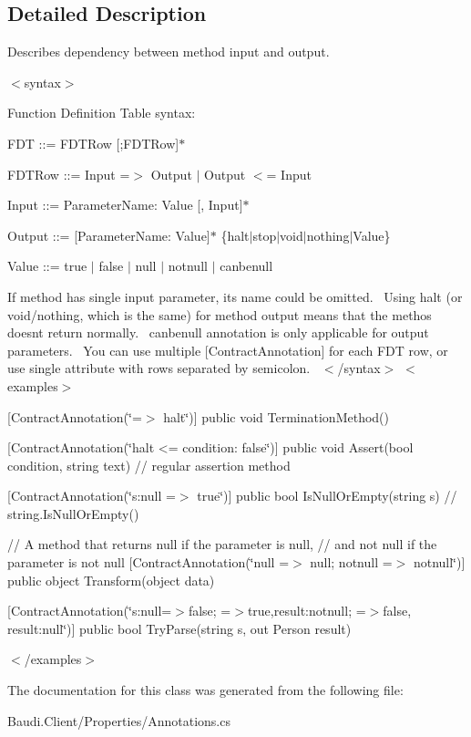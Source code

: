\subsection{Detailed Description}
Describes dependency between method input and output. 

$<$syntax$>$ 

Function Definition Table syntax\+:


\begin{DoxyItemize}
\item F\+D\+T \+:\+:= F\+D\+T\+Row \mbox{[};F\+D\+T\+Row\mbox{]}$\ast$ 
\item F\+D\+T\+Row \+:\+:= Input =$>$ Output $\vert$ Output $<$= Input 
\item Input \+:\+:= Parameter\+Name\+: Value \mbox{[}, Input\mbox{]}$\ast$ 
\item Output \+:\+:= \mbox{[}Parameter\+Name\+: Value\mbox{]}$\ast$ \{halt$\vert$stop$\vert$void$\vert$nothing$\vert$\+Value\} 
\item Value \+:\+:= true $\vert$ false $\vert$ null $\vert$ notnull $\vert$ canbenull 
\end{DoxyItemize}If method has single input parameter, it\textquotesingle{}s name could be omitted.~\newline
 Using {\ttfamily halt} (or {\ttfamily void}/{\ttfamily nothing}, which is the same) for method output means that the methos doesn\textquotesingle{}t return normally.~\newline
 {\ttfamily canbenull} annotation is only applicable for output parameters.~\newline
 You can use multiple {\ttfamily \mbox{[}Contract\+Annotation\mbox{]}} for each F\+D\+T row, or use single attribute with rows separated by semicolon.~\newline
 $<$/syntax$>$ $<$examples$>$
\begin{DoxyItemize}
\item {\ttfamily  \mbox{[}Contract\+Annotation(\char`\"{}=$>$ halt\char`\"{})\mbox{]} public void Termination\+Method() } 
\item {\ttfamily  \mbox{[}Contract\+Annotation(\char`\"{}halt <= condition\+: false\char`\"{})\mbox{]} public void Assert(bool condition, string text) // regular assertion method } 
\item {\ttfamily  \mbox{[}Contract\+Annotation(\char`\"{}s\+:null =$>$ true\char`\"{})\mbox{]} public bool Is\+Null\+Or\+Empty(string s) // string.\+Is\+Null\+Or\+Empty() } 
\item {\ttfamily  // A method that returns null if the parameter is null, // and not null if the parameter is not null \mbox{[}Contract\+Annotation(\char`\"{}null =$>$ null; notnull =$>$ notnull\char`\"{})\mbox{]} public object Transform(object data) } 
\item {\ttfamily  \mbox{[}Contract\+Annotation(\char`\"{}s\+:null=$>$false; =$>$true,result\+:notnull; =$>$false, result\+:null\char`\"{})\mbox{]} public bool Try\+Parse(string s, out Person result) } 
\end{DoxyItemize}$<$/examples$>$ 

The documentation for this class was generated from the following file\+:\begin{DoxyCompactItemize}
\item 
Baudi.\+Client/\+Properties/Annotations.\+cs\end{DoxyCompactItemize}
